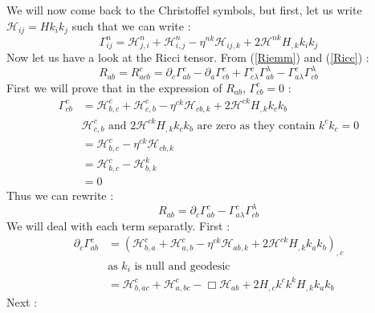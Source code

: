 \documentclass[a4paper,12pt]{article}
\theoremstyle{definition}
\begin{document}
We will now come back to the Christoffel symbols, but first, let us write $\mathcal{H}_{ij}=Hk_ik_j$ such that we can write :
\begin{equation}
	\Gamma^n_{ij}=\mathcal{H}^n_{j,i}+\mathcal{H}^n_{i,j}-\eta^{nk}\mathcal{H}_{ij,k}+2\mathcal{H}^{nk}H_{,k}k_ik_j
\end{equation}
Now let us have a look at the Ricci tensor. From (\ref{Riemm}) and (\ref{Ricc}) :
\begin{equation}
	R_{ab}=R^c_{acb}=\partial_c\Gamma^c_{ab}-\partial_a\Gamma^c_{cb}+\Gamma^c_{c\lambda}\Gamma^\lambda_{ab}-\Gamma^c_{a\lambda}\Gamma^\lambda_{cb}
\end{equation}
First we will prove that in the expression of $R_{ab}$, $\Gamma^c_{cb}=0$ :
\begin{equation}
\begin{split}
	\Gamma^c_{cb}&=\mathcal{H}^c_{b,c}+\mathcal{H}^c_{c,b}-\eta^{ck}\mathcal{H}_{cb,k}+2\mathcal{H}^{ck}H_{,k}k_ck_b\\
	&\text{$\mathcal{H}^c_{c,b}$ and $2\mathcal{H}^{ck}H_{,k}k_ck_b$ are zero as they contain $k^ck_c=0$}\\
	&=\mathcal{H}^c_{b,c}-\eta^{ck}\mathcal{H}_{cb,k}\\
	&=\mathcal{H}^c_{b,c}-\mathcal{H}^k_{b,k}\\
	&=0
\end{split}
\end{equation}
Thus we can rewrite :
\begin{equation}
	R_{ab}=\partial_c\Gamma^c_{ab}-\Gamma^c_{a\lambda}\Gamma^\lambda_{cb}
\end{equation}
We will deal with each term separatly.
First :
\begin{equation}
\begin{split}
	\partial_c\Gamma^c_{ab}&=(\mathcal{H}^c_{b,a}+\mathcal{H}^c_{a,b}-\eta^{ck}\mathcal{H}_{ab,k}+2\mathcal{H}^{ck}H_{,k}k_ak_b)_{,c}\\
	&\text{as $k_i$ is null and geodesic}\\
	&=\mathcal{H}^c_{b,ac}+\mathcal{H}^c_{a,bc}-\Box\mathcal{H}_{ab}+2H_{,c}k^ck^kH_{,k}k_ak_b
\end{split}
\end{equation}
Next :
\end{document}
